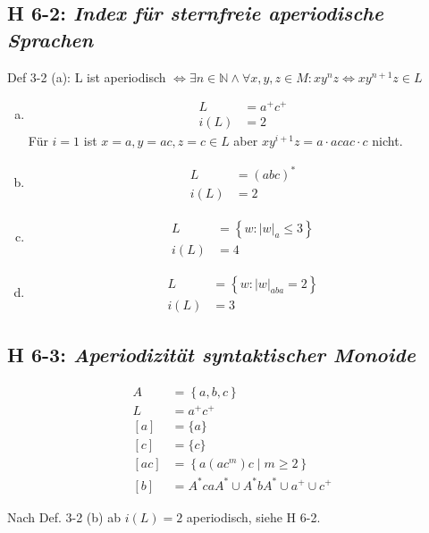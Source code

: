 \documentclass{scrartcl}
\begin{document}
\subsection{H 6-2: \textsl{Index für sternfreie aperiodische Sprachen}}

Def 3-2 (a): L ist aperiodisch $\Leftrightarrow \exists n \in \mathbb{N}\wedge\forall x,y,z \in M: xy^nz \Leftrightarrow xy^{n+1}z \in L$

\begin{enumerate}[(a)]
  \item
    \begin{align*}
      L &= a^+c^+\\
      i(L) &= 2
    \end{align*}
    Für $i = 1$ ist $x=a, y=ac, z=c \in L$ aber $xy^{i+1}z = a\cdot acac\cdot c$ nicht.
  \item
    \begin{align*}
      L &= (abc)^*\\
      i(L) &= 2
    \end{align*}
  \item
    \begin{align*}
    L &= \left\{ w : |w|_a \leq 3\right\}\\
    i(L) &= 4
    \end{align*}
  \item
    \begin{align*}
    L &= \left\{ w : |w|_{aba} = 2\right\}\\
    i(L) &= 3
    \end{align*}
\end{enumerate}

\subsection{H 6-3: \textsl{Aperiodizität syntaktischer Monoide}}

\begin{align*}
  A &= \left\{a,b,c\right\}\\
  L &= a^+c^+\\
  [a] &= \{a\}\\
  [c] &= \{c\}\\
  [ac] &= \left\{a(ac^m)c\;|\;m \geq 2\right\}\\
  [b] &= A^*caA^* \cup A^*bA^* \cup a^+ \cup c^+
\end{align*}

Nach Def. 3-2 (b) ab $i(L) = 2$ aperiodisch, siehe H 6-2.

\end{document}
